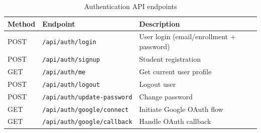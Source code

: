 \begin{table}[!ht]
\centering
\begin{tabular}{|l|l|p{7cm}|}
\hline
\textbf{Method} & \textbf{Endpoint} & \textbf{Description} \\ \hline
POST  & \texttt{/api/auth/login}             & User login (email/enrollment + password) \\
POST  & \texttt{/api/auth/signup}            & Student registration \\
GET   & \texttt{/api/auth/me}               & Get current user profile \\
POST  & \texttt{/api/auth/logout}           & Logout user \\
POST  & \texttt{/api/auth/update-password}  & Change password \\
GET   & \texttt{/api/auth/google/connect}   & Initiate Google OAuth flow \\
GET   & \texttt{/api/auth/google/callback}  & Handle OAuth callback \\ \hline
\end{tabular}
\caption{Authentication API endpoints}
\label{tab:api_auth}
\end{table}
